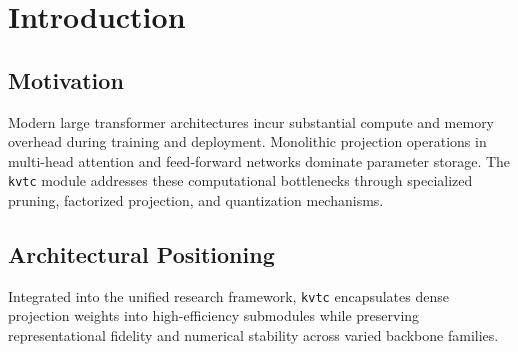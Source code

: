 \section{Introduction}

\subsection{Motivation}
Modern large transformer architectures incur substantial compute and memory overhead during training and deployment. Monolithic projection operations in multi-head attention and feed-forward networks dominate parameter storage. The \texttt{kvtc} module addresses these computational bottlenecks through specialized pruning, factorized projection, and quantization mechanisms.

\subsection{Architectural Positioning}
Integrated into the unified research framework, \texttt{kvtc} encapsulates dense projection weights into high-efficiency submodules while preserving representational fidelity and numerical stability across varied backbone families.
